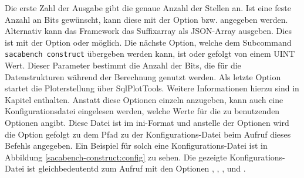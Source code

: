 {Die erste Zahl der Ausgabe gibt die genaue Anzahl der Stellen an.
Ist eine feste Anzahl an Bits gew{\"u}nscht, kann diese mit der Option  bzw.  angegeben werden.
Alternativ kann das Framework das Suffixarray als JSON-Array ausgeben. 
Dies ist mit der Option  oder  möglich.
Die nächste Option, welche dem Subcommand \texttt{sacabench construct} {\"u}bergeben werden kann, ist  oder  gefolgt von einem UINT Wert. 
Dieser Parameter bestimmt die Anzahl der Bits, die f{\"u}r die Datenstrukturen w{\"a}hrend der Berechnung genutzt werden.
Als letzte Option startet  die Ploterstellung über SqlPlotTools. 
Weitere Informationen hierzu sind in Kapitel  enthalten.
Anstatt diese Optionen einzeln anzugeben, kann auch eine Konfigurationsdatei eingelesen werden, welche Werte für die zu benutzenden Optionen angibt.
Diese Datei ist im ini-Format und anstelle der Optionen wird die Option  gefolgt zu dem Pfad zu der Konfigurations-Datei beim Aufruf dieses Befehls angegeben.
Ein Beispiel für solch eine Konfigurations-Datei ist in Abbildung \ref{sacabench-construct:config} zu sehen.
Die gezeigte Konfigurations-Datei ist gleichbedeutentd zum Aufruf mit den Optionen , , ,  und .
\par
}


